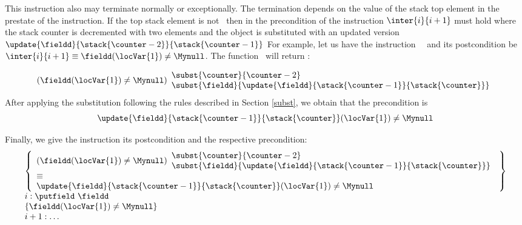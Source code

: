 \begin{itemize}
\begin{enumerate}
			                This instruction  also may terminate normally or exceptionally. The termination depends on the value of the stack 
					top element in the prestate of the instruction. If the top stack element is not \Mynull \ then in the precondition
					of the instruction $\inter{i}{i+1}$ must hold where the stack counter is decremented with two elements and
					the \fieldd object is substituted with an updated version $\update{\fieldd}{ \stack{\counter - 2}}{  \stack{\counter  -1} } $
					For example, let us have the instruction \putfield \ \fieldd \ and its postcondition be
					$ \inter{i}{i+1} \equiv \fieldd( \locVar{1})  \neq \Mynull $. The function \fwpi \ will return : 
					 
					$$
					 (\fieldd( \locVar{1})  \neq \Mynull  )
					          \begin{array}{l} 
					                     \subst{ \counter }{  \counter -2 } \\
							     \subst{  \fieldd}{ \update{\fieldd}{ \stack{\counter - 1}}{  \stack{\counter } } }
                                             	  \end{array}
					$$
					After applying the substitution following the rules 
					described in Section \ref{subst}, we obtain that the precondition is 
					$$ \update{\fieldd}{ \stack{\counter - 1} }{\stack{\counter} }( \locVar{1})  \neq \Mynull  $$
					
					Finally, we give the instruction \putfield its postcondition and the respective precondition:
					$$
					\begin{array}{l}
					 \left\{\begin{array}{l} 
					       (\fieldd( \locVar{1})  \neq \Mynull  )
					          \begin{array}{l} 
					                     \subst{ \counter }{  \counter -2 } \\
							     \subst{  \fieldd}{ \update{\fieldd}{ \stack{\counter - 1}}{  \stack{\counter } } }
                                             	  \end{array}\\
					      \equiv \\
					      \update{\fieldd}{ \stack{\counter - 1} }{\stack{\counter} }( \locVar{1})  \neq \Mynull \\
					   \end{array}\right\}   \\
					  i: \putfield  \ \fieldd\\
					  \{\fieldd( \locVar{1})  \neq \Mynull \} \\
					  i+1: \ldots 
					\end{array}
					$$
					

\end{enumerate}
\end{itemize}

